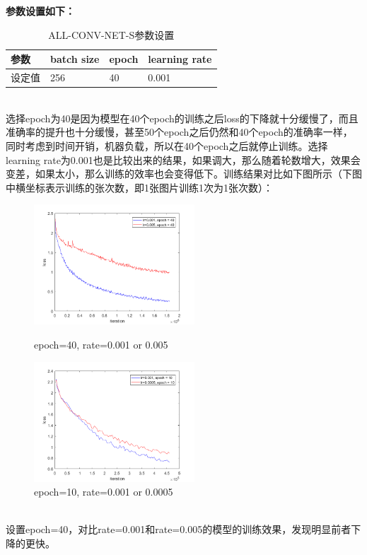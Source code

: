 \documentclass[a4paper,UTF8]{article}
\numberwithin{equation}{section}
\begin{document}
\begin{enumerate}
\textbf{参数设置如下：}
\begin{table}[h]
	\centering
	\caption{ALL-CONV-NET-S参数设置}
	\label{acn1}
	\begin{tabular}{|l|l|l|l|}
		\hline
	参数	& batch size & epoch & learning rate \\ \hline
	设定值	& 256 & 40 & 0.001 \\ \hline
	\end{tabular}
\end{table}\\
选择epoch为40是因为模型在40个epoch的训练之后loss的下降就十分缓慢了，而且准确率的提升也十分缓慢，甚至50个epoch之后仍然和40个epoch的准确率一样，同时考虑到时间开销，机器负载，所以在40个epoch之后就停止训练。选择learning rate为0.001也是比较出来的结果，如果调大，那么随着轮数增大，效果会变差，如果太小，那么训练的效率也会变得低下。训练结果对比如下图所示（下图中横坐标表示训练的张次数，即1张图片训练1次为1张次数）：
\begin{figure}[htbp]
	\centering
	\begin{minipage}[t]{0.48\textwidth}
		\centering
		\includegraphics[width=6cm]{acns-001-005-40.png}
		\caption{epoch=40, rate=0.001 or 0.005}
	\end{minipage}
	\begin{minipage}[t]{0.48\textwidth}
		\centering
		\includegraphics[width=6cm]{acns-001-0005-10.png}
		\caption{epoch=10, rate=0.001 or 0.0005}
	\end{minipage}
\end{figure}\\
设置epoch=40，对比rate=0.001和rate=0.005的模型的训练效果，发现明显前者下降的更快。\\

\end{enumerate}
\end{document}
